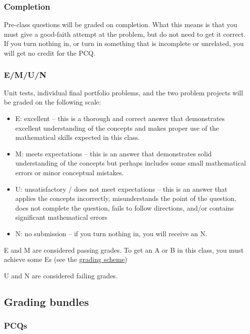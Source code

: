 \documentclass[
  letterpaper,
  DIV=11,
  numbers=noendperiod]{scrartcl}
\providecommand{\tightlist}{%
  \setlength{\itemsep}{0pt}\setlength{\parskip}{0pt}}\usepackage{longtable,booktabs,array}
\begin{document}
\subsubsection{Completion}

Pre-class questions will be graded on completion. What this means is
that you must give a good-faith attempt at the problem, but do not need
to get it correct. If you turn nothing in, or turn in something that is
incomplete or unrelated, you will get no credit for the PCQ.

\subsubsection{E/M/U/N}

Unit tests, individual final portfolio problems, and the two problem
projects will be graded on the following scale:

\begin{itemize}
\tightlist
\item
  E: excellent -- this is a thorough and correct answer that
  demonstrates excellent understanding of the concepts and makes proper
  use of the mathematical skills expected in this class.
\item
  M: meets expectations -- this is an answer that demonstrates solid
  understanding of the concepts but perhaps includes some small
  mathematical errors or minor conceptual mistakes.
\item
  U: unsatisfactory / does not meet expectations -- this is an answer
  that applies the concepts incorrectly, misunderstands the point of the
  question, does not complete the question, fails to follow directions,
  and/or contains significant mathematical errors
\item
  N: no submission -- if you turn nothing in, you will receive an N.
\end{itemize}

E and M are considered passing grades. To get an A or B in this class,
you must achieve some Es (see the \hyperref[gradingscheme]{grading
scheme})

U and N are considered failing grades.

\subsection{Grading bundles}\label{grading-bundles}

\subsubsection{PCQs}
\end{document}
